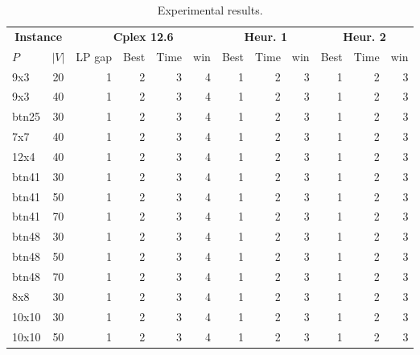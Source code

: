 \setlength{\tabcolsep}{3.5 pt}
\renewcommand\arraystretch{1.1}
\begin{table} 
	\scriptsize
	\center
	\begin{tabular}{lc|rrrr|rrr|rrr}
		\hline
		\multicolumn{2}{c}{\bf Instance} & \multicolumn{4}{|c}{{\bf Cplex 12.6}} & \multicolumn{3}{|c}{{\bf Heur. 1}} & \multicolumn{3}{|c}{{\bf Heur. 2}}\\
		{\bf $P$} & $|V|$ & LP gap & Best & Time & win & Best & Time & win & Best & Time & win \\
		\hline
		9x3 & 20 & 1 & 2 & 3 & 4 & 1 & 2 & 3 & 1 & 2 & 3 \\
		9x3 & 40 & 1 & 2 & 3 & 4 & 1 & 2 & 3 & 1 & 2 & 3 \\
		btn25 & 30 & 1 & 2 & 3 & 4 & 1 & 2 & 3 & 1 & 2 & 3 \\
		7x7 & 40 & 1 & 2 & 3 & 4 & 1 & 2 & 3 & 1 & 2 & 3 \\
		12x4 & 40 & 1 & 2 & 3 & 4 & 1 & 2 & 3 & 1 & 2 & 3 \\
		btn41 & 30 & 1 & 2 & 3 & 4 & 1 & 2 & 3 & 1 & 2 & 3 \\
		btn41 & 50 & 1 & 2 & 3 & 4 & 1 & 2 & 3 & 1 & 2 & 3 \\
		btn41 & 70 & 1 & 2 & 3 & 4 & 1 & 2 & 3 & 1 & 2 & 3 \\
		btn48 & 30 & 1 & 2 & 3 & 4 & 1 & 2 & 3 & 1 & 2 & 3 \\
		btn48 & 50 & 1 & 2 & 3 & 4 & 1 & 2 & 3 & 1 & 2 & 3 \\
		btn48 & 70 & 1 & 2 & 3 & 4 & 1 & 2 & 3 & 1 & 2 & 3 \\
		8x8 & 30 & 1 & 2 & 3 & 4 & 1 & 2 & 3 & 1 & 2 & 3 \\
		10x10 & 30 & 1 & 2 & 3 & 4 & 1 & 2 & 3 & 1 & 2 & 3 \\
		10x10 & 50 & 1 & 2 & 3 & 4 & 1 & 2 & 3 & 1 & 2 & 3 \\
		\hline
	\end{tabular}
	\normalsize
	\caption{Experimental results.} 
	\label{tabRes}
\end{table}
%